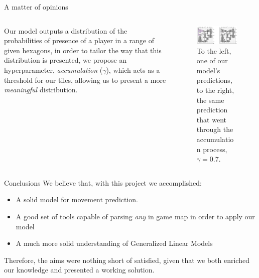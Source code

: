 \documentclass[english]{beamer}
\begin{document}
\begin{frame}{A matter of opinions}
  \begin{columns}
    \begin{column}{0.45\textwidth}
      Our model outputs a distribution of the probabilities of presence of a player in a range of given hexagons, in order to tailor the way that 
      this distribution is presented, we propose an hyperparameter, \emph{accumulation} ($\gamma$), which acts as a threshold for our tiles, allowing us to 
      present a more \emph{meaningful} distribution.
    \end{column}
    \begin{column}{0.55\textwidth}
      \begin{figure}
        \centering
        \includegraphics[width=1\textwidth]{images/wildfire_v_non2.png}
        \caption{To the left, one of our model's predictions, to the right, the same prediction that went through the accumulation process, $\gamma = 0.7$.}
        \end{figure}
    \end{column}
  \end{columns}
\end{frame}

\begin{frame}{Conclusions}
  We believe that, with this project we accomplished:
  \begin{itemize}
    \item A solid model for movement prediction.
    \item A good set of tools capable of parsing \emph{any} in game map in order to apply our model
    \item A much more solid understanding of Generalized Linear Models
  \end{itemize}
  Therefore, the aims were nothing short of satisfied, given that we both enriched our knowledge and presented a working solution.
\end{frame}
\end{document}
